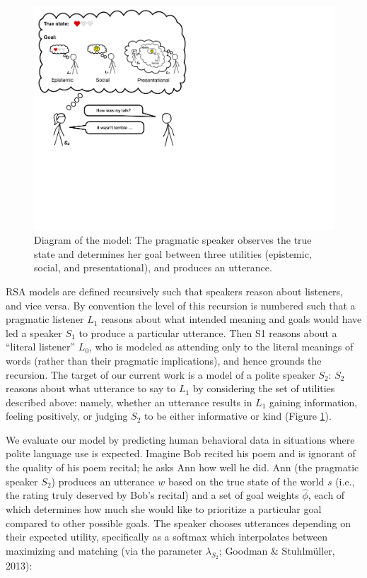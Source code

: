 \documentclass[floatsintext,man]{apa6}
\theoremstyle{definition}
\theoremstyle{definition}
\theoremstyle{definition}
\theoremstyle{remark}
\begin{document}
\begin{figure}
\centering
\includegraphics{fig/model.pdf}
\caption{\label{fig:model}Diagram of the model: The pragmatic speaker
observes the true state and determines her goal between three utilities
(epistemic, social, and presentational), and produces an utterance.}
\end{figure}

RSA models are defined recursively such that speakers reason about
listeners, and vice versa. By convention the level of this recursion is
numbered such that a pragmatic listener \(L_1\) reasons about what
intended meaning and goals would have led a speaker \(S_1\) to produce a
particular utterance. Then S1 reasons about a \enquote{literal listener}
\(L_0\), who is modeled as attending only to the literal meanings of
words (rather than their pragmatic implications), and hence grounds the
recursion. The target of our current work is a model of a polite speaker
\(S_2\): \(S_2\) reasons about what utterance to say to \(L_1\) by
considering the set of utilities described above: namely, whether an
utterance results in \(L_1\) gaining information, feeling positively, or
judging \(S_2\) to be either informative or kind (Figure
\ref{fig:model}).

We evaluate our model by predicting human behavioral data in situations
where polite language use is expected. Imagine Bob recited his poem and
is ignorant of the quality of his poem recital; he asks Ann how well he
did. Ann (the pragmatic speaker \(S_2\)) produces an utterance \(w\)
based on the true state of the world \(s\) (i.e., the rating truly
deserved by Bob's recital) and a set of goal weights \(\hat{\phi}\),
each of which determines how much she would like to prioritize a
particular goal compared to other possible goals. The speaker chooses
utterances depending on their expected utility, specifically as a
softmax which interpolates between maximizing and matching (via the
parameter \(\lambda_{S_2}\); Goodman \& Stuhlmüller, 2013):
\end{document}
